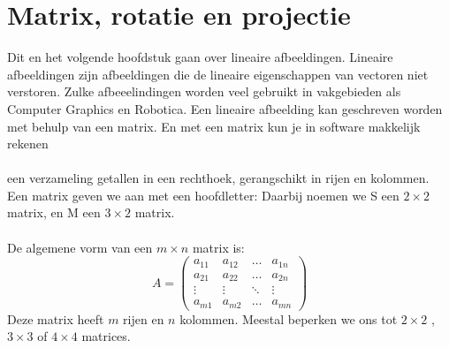 \chapter{Matrix, rotatie en projectie}
\label{chap: matrix, rotatie en projectie}

Dit en het volgende hoofdstuk gaan over lineaire afbeeldingen. Lineaire afbeeldingen zijn afbeeldingen die de lineaire eigenschappen van  vectoren niet verstoren. Zulke afbeeelindingen worden veel gebruikt in vakgebieden als Computer Graphics en Robotica. Een lineaire afbeelding kan geschreven worden met behulp van een matrix. En met een matrix kun je in software makkelijk rekenen\\ \\
{een verzameling getallen in een rechthoek, gerangschikt in rijen en kolommen.}\\
Een matrix geven we aan met een hoofdletter:
Daarbij noemen we S een $ 2 \times 2 $ matrix, en M een $ 3 \times 2 $ matrix. \\ \\
De algemene vorm van een $ m \times n $ matrix is:
$$
A = \begin{pmatrix}
a_{11} &  a_{12}  & \ldots & a_{1n}\\
a_{21}  &  a_{22} & \ldots & a_{2n}\\
\vdots & \vdots & \ddots & \vdots\\
a_{m1}  &   a_{m2}       &\ldots & a_{mn}
\end{pmatrix}
$$
Deze matrix heeft $ m $ rijen en $ n $ kolommen. Meestal beperken we ons tot $ 2 \times 2 $ , \  $ 3 \times 3 $ of $ 4 \times 4 $ matrices.

